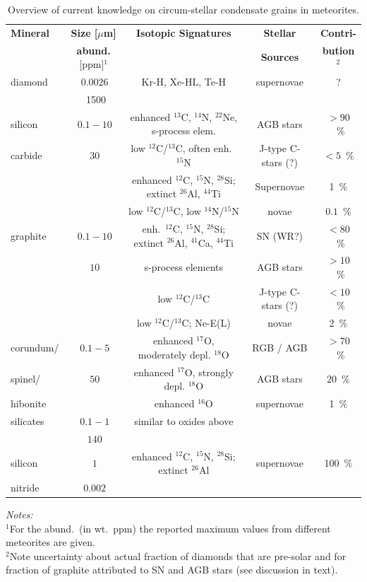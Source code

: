 \documentclass{iau}
\begin{document}
 
\begin{table}
  \begin{center}
  \caption{Overview of current knowledge on circum-stellar condensate grains in meteorites.}
  \label{tab1}
 {\scriptsize
  \begin{tabular}{|l|c|c|c|c|}\hline 
{\bf Mineral} & {\bf Size [$\mu$m]} & {\bf Isotopic Signatures} & {\bf Stellar} & {\bf Contri-} \\ 
   &  {\bf abund.}  [ppm]$^1$ & & {\bf Sources} & {\bf bution$^2$} \\ \hline
diamond & $~0.0026$ & Kr-H, Xe-HL, Te-H & supernovae & ? \\
   & ~1500 & & & \\ \hline
silicon & $~0.1-10$ & enhanced $^{13}$C, $^{14}$N, $^{22}$Ne, s-process elem. & AGB stars & $> 90$~\% \\
carbide & $~30$ & low $^{12}$C/$^{13}$C, often enh.\ $^{15}$N & J-type C-stars (?) & $< 5$~\% \\
 & & enhanced $^{12}$C, $^{15}$N, $^{28}$Si; extinct $^{26}$Al, $^{44}$Ti & Supernovae & 1~\% \\
 & & low $^{12}$C/$^{13}$C, low $^{14}$N/$^{15}$N & novae &  $0.1$~\% \\ \hline
graphite & $~0.1-10$ & enh.\ $^{12}$C, $^{15}$N, $^{28}$Si; extinct $^{26}$Al, $^{41}$Ca, $^{44}$Ti &
 SN (WR?) & $< 80$~\% \\ 
 & $~10$ & s-process elements & AGB stars & $> 10$~\% \\
 & & low $^{12}$C/$^{13}$C  & J-type C-stars (?) & $< 10$~\% \\
 & & low $^{12}$C/$^{13}$C; Ne-E(L) & novae & 2~\% \\ \hline
 corundum/ & $~0.1-5$ & enhanced $^{17}$O, moderately depl. $^{18}$O & RGB / AGB & $> 70$~\% \\
 spinel/ & $~50$ & enhanced $^{17}$O, strongly depl. $^{18}$O & AGB stars & 20~\% \\
 hibonite & & enhanced $^{16}$O & supernovae & 1~\% \\ \hline
 silicates & $~0.1-1$ & similar to oxides above & & \\
 &  $~140$ & & & \\ \hline
 silicon & $~1$ & enhanced $^{12}$C, $^{15}$N, $^{28}$Si; extinct $^{26}$Al & supernovae & 100~\% \\
 nitride & $~ 0.002$ & & & \\ \hline
  \end{tabular}
  }
 \end{center}
\vspace{1mm}
 \scriptsize{
 {\it Notes:}\\
  $^1$For the abund.\ (in wt.\ ppm) the reported maximum values from different meteorites are given. \\
  $^2$Note uncertainty about actual fraction of diamonds that are pre-solar and for fraction of graphite attributed to SN and AGB stars (see discussion in text).}
\end{table}
\end{document}
